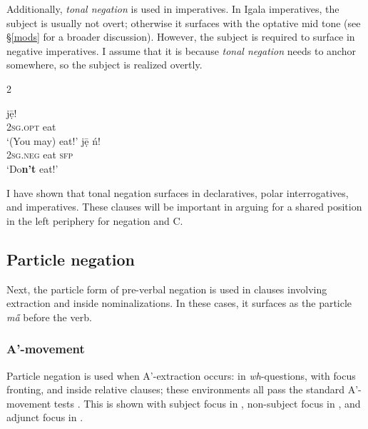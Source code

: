 \documentclass[output=paper,colorlinks,citecolor=brown,
]{langscibook}
\begin{document}
Additionally, \textit{tonal negation} is used in imperatives. In Igala imperatives, the subject is usually not overt; otherwise it surfaces with the optative mid tone (see \S\ref{mods} for a broader discussion). However, the subject is required to surface in negative imperatives. I assume that it is because \textit{tonal negation} needs to anchor somewhere, so the subject is realized overtly.

\begin{multicols}{2}
\ea 
    \begin{xlist} \ex\gll  {} j\={ẹ}!\\
        \textsc{2sg.opt}  eat\\
       \glt  `(You may) eat!'
    \ex\gll\label{imp} j\={ẹ} \'{n}!\\
        \textsc{2sg}.\textsc{neg} eat \textsc{sfp} \\
       \glt  `Do\textbf{n’t} eat!'
\end{xlist}
\z

\end{multicols}

I have shown that tonal negation surfaces in declaratives, polar interrogatives, and imperatives. These clauses will be important in arguing for a shared position in the left periphery for negation and C. 

\subsection{Particle negation}\label{partn}

Next, the particle form of pre-verbal negation is used in clauses involving extraction and inside nominalizations. In these cases, it surfaces as the particle \textit{m\H{a}} before the verb. 

\subsubsection{A'-movement}

Particle negation is used when A'-extraction occurs: in \textit{wh}-questions, with focus fronting, and inside relative clauses; these environments all pass the standard A'-movement tests \citep{martinovicresumption}. This is shown with subject focus in , non-subject focus in , and adjunct focus in .%
\end{document}
